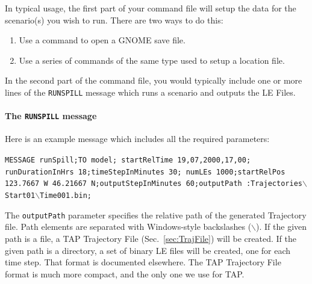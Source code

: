 \documentclass[12pt]{article}      %
\newcommand{\tap}{\textsf{TAP}\xspace}
\newcommand{\gnome}{\textsf{GNOME}\xspace}
\newcommand{\command}[1]{\texttt{#1}}
\newcommand{\fileline}[1]{\begin{flushleft}\texttt{#1}\end{flushleft}}
\begin{document}
In typical usage, the first part of your command file will setup the
data for the scenario(s) you wish to run.  There are two ways to do
this:
\begin{enumerate}
\item Use a command to open a \gnome save file.
\item Use a series of commands of the same type used to setup a location
  file.
\end{enumerate}
In the second part of the command file, you would typically include one
or more lines of the \command{RUNSPILL} message which runs a scenario and outputs
the LE Files.

\paragraph{The \command{RUNSPILL} message}

Here is an example message which includes all the required parameters:

\fileline{MESSAGE runSpill;TO model;  startRelTime 19,07,2000,17,00;
  runDurationInHrs 18;timeStepInMinutes 30; numLEs 1000;startRelPos
  123.7667 W 46.21667 N;outputStepInMinutes 60;outputPath
  :Trajectories$\backslash$Start01$\backslash$Time001.bin;}

The \command{outputPath} parameter specifies the relative path of the
generated Trajectory file. Path elements are separated with
Windows-style backslashes ($\backslash$). If the given path is a file, a
\tap Trajectory File (Sec.~\ref{sec:TrajFile}) will be created. If the
given path is a directory, a set of binary LE files will be created, one
for each time step. That format is documented elsewhere. The \tap
Trajectory File format is much more compact, and the only one we use for
\tap.
\end{document}

